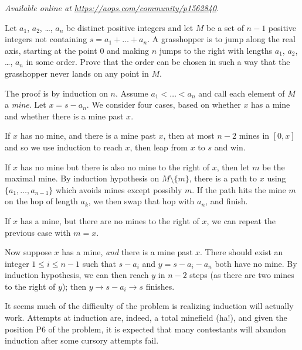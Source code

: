 
\textsl{Available online at \url{https://aops.com/community/p1562840}.}
\begin{mdframed}[style=mdpurplebox,frametitle={Problem statement}]
Let $a_1$, $a_2$, \dots, $a_n$ be distinct positive integers and
let $M$ be a set of $n-1$ positive integers not containing $s = a_1 + \dots + a_n$.
A grasshopper is to jump along the real axis, starting at the point $0$ and
making $n$ jumps to the right with lengths $a_1$, $a_2$, \dots, $a_n$ in some order.
Prove that the order can be chosen in such a way that
the grasshopper never lands on any point in $M$.
\end{mdframed}
The proof is by induction on $n$.
Assume $a_1 < \dots < a_n$ and call each element of $M$ a \emph{mine}.
Let $x = s - a_n$.
We consider four cases, based on whether $x$ has a mine
and whether there is a mine past $x$.
\begin{itemize}
  \ii If $x$ has no mine, and there is a mine past $x$,
  then at most $n-2$ mines in $[0, x]$ and so we use induction to reach $x$,
  then leap from $x$ to $s$ and win.

  \ii If $x$ has no mine but there is also no mine to the right of $x$,
  then let $m$ be the maximal mine.
  By induction hypothesis on $M \setminus \{m\}$, there is a path to $x$
  using $\{a_1, \dots, a_{n-1}\}$ which avoids mines except possibly $m$.
  If the path hits the mine $m$ on the hop of length $a_k$,
  we then swap that hop with $a_n$, and finish.

  \ii If $x$ has a mine, but there are no mines to the right of $x$,
  we can repeat the previous case with $m = x$.

  \ii Now suppose $x$ has a mine, \emph{and} there is a mine past $x$.
  There should exist an integer $1 \le i \le n-1$
  such that $s-a_i$ and $y = s-a_i-a_n$ both have no mine.
  By induction hypothesis, we can then reach $y$ in $n-2$ steps
  (as there are two mines to the right of $y$); then $y \to s-a_i \to s$ finishes.
\end{itemize}

\begin{remark*}
  It seems much of the difficulty of the problem is realizing induction will actually work.
  Attempts at induction are, indeed, a total minefield (ha!),
  and given the position P6 of the problem, it is expected that many contestants
  will abandon induction after some cursory attempts fail.
\end{remark*}
\pagebreak



